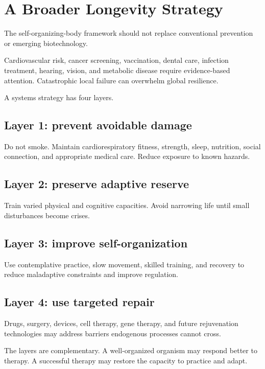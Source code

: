 \chapter{A Broader Longevity Strategy}

The self-organizing-body framework should not replace conventional prevention or emerging biotechnology.

Cardiovascular risk, cancer screening, vaccination, dental care, infection treatment, hearing, vision, and metabolic disease require evidence-based attention. Catastrophic local failure can overwhelm global resilience.

A systems strategy has four layers.

\section{Layer 1: prevent avoidable damage}

Do not smoke. Maintain cardiorespiratory fitness, strength, sleep, nutrition, social connection, and appropriate medical care. Reduce exposure to known hazards.

\section{Layer 2: preserve adaptive reserve}

Train varied physical and cognitive capacities. Avoid narrowing life until small disturbances become crises.

\section{Layer 3: improve self-organization}

Use contemplative practice, slow movement, skilled training, and recovery to reduce maladaptive constraints and improve regulation.

\section{Layer 4: use targeted repair}

Drugs, surgery, devices, cell therapy, gene therapy, and future rejuvenation technologies may address barriers endogenous processes cannot cross.

The layers are complementary. A well-organized organism may respond better to therapy. A successful therapy may restore the capacity to practice and adapt.

